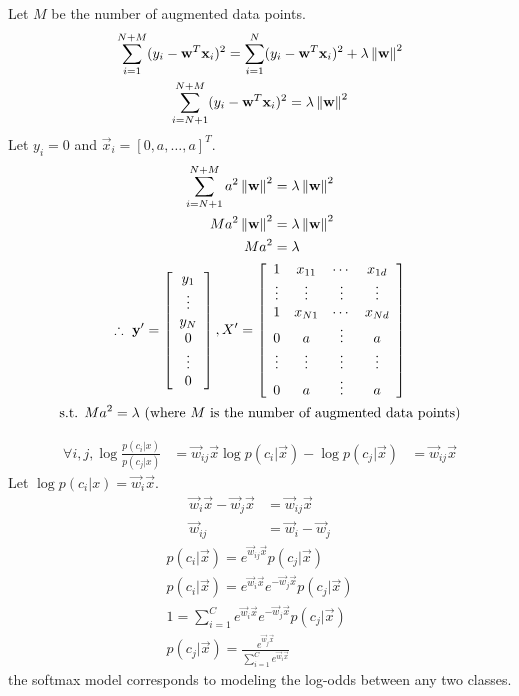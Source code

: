 \documentclass{introtosml}
\newcommand{\x}{\vec{x}}
\newcommand{\w}{\vec{w}}
\begin{document}
\begin{p}
  \item
    Let $M$ be the number of augmented data points.
    \begin{gather*}
      \sum_{i=1}^{N+M} (y_i - \w^T \x_i)^2
          = \sum_{i=1}^{N} (y_i - \w^T \x_i)^2 + \lambda \norm{\w}^2 \\
      \sum_{i=N+1}^{N+M} (y_i - \w^T \x_i)^2 = \lambda \norm{\w}^2
    \end{gather*}
    Let $y_i = 0$ and $\x_i = [0, a, \ldots, a]^T $.
    \begin{gather*}
      \begin{aligned}
        \sum_{i=N+1}^{N+M} a^2 \norm{\w}^2 & = \lambda \norm{\w}^2 \\
        M a^2 \norm{\w}^2 & = \lambda \norm{\w}^2 \\
        M a^2 & = \lambda
      \end{aligned} \\
      \therefore \vec{y}' = \left[\begin{array}{cccc}
        y_1 \\ \vdots \\ y_N \\ 0 \\ \vdots \\ 0
      \end{array}\right],
      X' = \left[\begin{array}{cccc}
        1 & x_{11} & \cdots & x_{1d} \\
        \vdots & \vdots & \vdots & \vdots  \\
        1 & x_{N1} & \cdots & x_{Nd} \\
        0 & a & \vdots & a \\
        \vdots & \vdots & \vdots & \vdots  \\
        0 & a & \vdots & a \\
      \end{array}\right] \\
      \st Ma^2 = \lambda \text{(where $M$ is the number of augmented data points)}
    \end{gather*}

  \item
    \begin{align*}
      \forall i, j, \log \frac{p(c_i|x)}{p(c_j|x)} & = \w_{ij} \x
      \log p(c_i|\x) - \log p(c_j|\x) & = \w_{ij} \x
    \end{align*}
    Let $\log p(c_i|x) = \w_i \x$.
    \begin{align*}
      \w_i \x - \w_j \x & = \w_{ij} \x \\
      \w_{ij} & = \w_i - \w_j
    \end{align*}
    \begin{align*}
      p(c_i|\x) = e^{\w_{ij} \x} p(c_j|\x) \\
      p(c_i|\x) = e^{\w_i \x} e^{- \w_j \x} p(c_j|\x) \\
      1 = \sum_{i=1}^C e^{\w_i \x} e^{- \w_j \x} p(c_j|\x) \\
      p(c_j|\x) = \frac{e^{\w_j \x}}{\sum_{i=1}^C e^{\w_i \x}}
    \end{align*}
    \therefore the softmax model corresponds to modeling the log-odds between any two classes.
\end{p}
\end{document}
